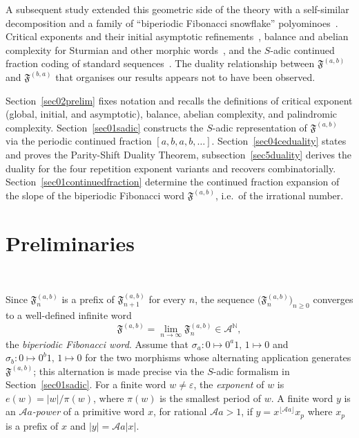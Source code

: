 \documentclass[12pt]{amsart}
\theoremstyle{plain}
\theoremstyle{definition}
\theoremstyle{remark}
\newcommand{\N}{\mathbb{N}}
\newcommand{\AlphA}{\mathcal{A}}
\newcommand{\FD}{\mathfrak{F}}
\begin{document}
A subsequent study extended this geometric side of the theory with a
self-similar decomposition and a family of ``biperiodic Fibonacci
snowflake'' polyominoes~\cite{FibSnowflake2024, Dumaine2009}. 
Critical exponents and their initial asymptotic refinements~\cite{Cassaigne2008, MousaviShallit2015}, balance and abelian
complexity for Sturmian and other morphic
words~\cite{BalkovaBrindaTurek2011, RichommeSaariZamboni2010}, and the
$S$-adic continued fraction coding of standard
sequences~\cite{AllouecheShallit2003, Lothaire2002}. The duality relationship
between $\FD^{(a,b)}$ and $\FD^{(b,a)}$ that organises our results appears
not to have been observed.


Section~\ref{sec02prelim} fixes notation and recalls the definitions of
critical exponent (global, initial, and asymptotic), balance, abelian
complexity, and palindromic complexity. Section~\ref{sec01sadic}
constructs the $S$-adic representation of $\FD^{(a,b)}$ via the periodic
continued fraction $[a,b,a,b,\ldots]$. Section~\ref{sec04ceduality} states
and proves the Parity-Shift Duality Theorem, subsection~\ref{sec5duality}
derives the duality for the four repetition exponent
variants and recovers combinatorially. 
Section~\ref{sec01continuedfraction} determine the continued fraction expansion of the
slope of the biperiodic Fibonacci word $\FD^{(a,b)}$, i.e.\ of the
irrational number.  
\section{Preliminaries}~\label{sec02prelim}

Since $\FD^{(a,b)}_n$ is a prefix of $\FD^{(a,b)}_{n+1}$ for every $n$, the sequence $\bigl(\FD^{(a,b)}_n\bigr)_{n\ge0}$
converges to a well-defined infinite word
\[
  \FD^{(a,b)} = \lim_{n\to\infty} \FD^{(a,b)}_n \in \AlphA^{\N},
\]
the \emph{biperiodic Fibonacci word}. Assume that $\sigma_a\colon 0\mapsto
0^a1,\,1\mapsto 0$ and $\sigma_b\colon 0\mapsto 0^b1,\,1\mapsto 0$ for
the two morphisms whose alternating application generates
$\FD^{(a,b)}$; this alternation is made precise via the $S$-adic
formalism in Section~\ref{sec01sadic}.  
For a finite word $w\ne\varepsilon$, the \emph{exponent} of $w$ is
$e(w) = |w|/\pi(w)$, where $\pi(w)$ is the smallest period of $w$. A
finite word $y$ is an \emph{$\AlphA a$-power} of a primitive word $x$, for
rational $\AlphA a>1$, if $y=x^{\lfloor\AlphA a\rfloor}x_p$ where $x_p$ is a
prefix of $x$ and $|y|=\AlphA a|x|$. 
\end{document}
